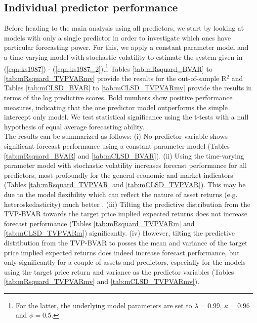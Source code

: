 \subsection{Individual predictor performance}
Before heading to the main analysis using all predictors, we start by looking at models with only a single predictor in order to investigate which ones have particular forecasting power. For this, we apply a constant parameter model and a time-varying model with stochastic volatility to estimate the system given in (\ref{eqn:ks1987}) - (\ref{eqn:ks1987_2}).\footnote{For the latter, the underlying model parameters are set to $\lambda=0.99$, $\kappa=0.96$ and $\phi=0.5$.} Tables \ref{tab:mRsquard_BVAR} to \ref{tab:mRsquard_TVPVARmv} provide the results for the out-of-sample R$^2$ and Tables \ref{tab:mCLSD_BVAR} to \ref{tab:mCLSD_TVPVARmv} provide the results in terms of the log predictive scores. Bold numbers show positive performance measures, indicating that the one predictor model outperforms the simple intercept only model. We test statistical significance using the \cite{diebold1995} t-tests with a null hypothesis of equal average forecasting ability.\\
%
\indent The results can be summarized as follows: (i) No predictor variable shows significant forecast performance using a constant parameter model (Tables \ref{tab:mRsquard_BVAR} and \ref{tab:mCLSD_BVAR}). (ii) Using the time-varying parameter model with stochastic volatility increases forecast performance for all predictors, most profoundly for the general economic and market indicators (Tables \ref{tab:mRsquard_TVPVAR} and \ref{tab:mCLSD_TVPVAR}). This may be due to the model flexibility which can reflect the nature of asset returns (e.g. heteroskedasticity) much better \citep[see also][]{johannes2014}.  (iii) Tilting the predictive distribution from the TVP-BVAR towards the target price implied expected returns does not increase forecast performance (Tables \ref{tab:mRsquard_TVPVARm} and \ref{tab:mCLSD_TVPVARm}) significantly. (iv) However, tilting the predictive distribution from the TVP-BVAR to posses the mean and variance of the target price implied expected returns does indeed increase forecast performance, but only significantly for a couple of assets and predictors, especially for the models using the target price return and variance as the predictor variables (Tables \ref{tab:mRsquard_TVPVARmv} and \ref{tab:mCLSD_TVPVARmv}).\\
%
